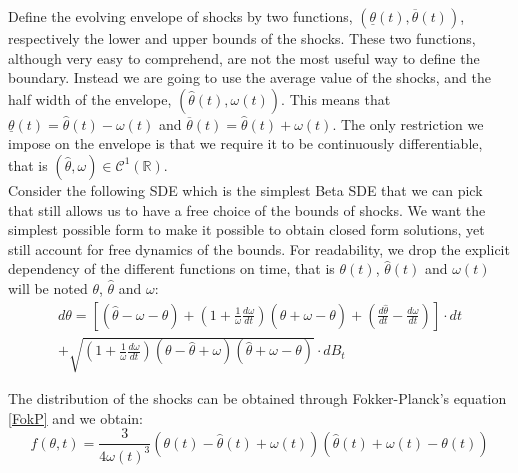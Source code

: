 Define the evolving envelope of shocks by two functions, $(\underline{\theta}(t),\overline{\theta}(t))$, respectively the lower and upper bounds of the shocks. These two functions, although very easy to comprehend, are not the most useful way to define the boundary. Instead we are going to use the average value of the shocks, and the half width of the envelope, $(\hat{\theta}(t), \omega(t))$. This means that $\underline{\theta}(t)=\hat{\theta}(t)-\omega(t)$ and $\overline{\theta}(t)=\hat{\theta}(t)+\omega(t)$. The only restriction we impose on the envelope is that we require it to be continuously differentiable, that is $(\hat{\theta},\omega)\in\mathcal{C}^1(\mathbb{R})$.\\

Consider the following SDE which is the simplest Beta SDE that we can pick that still allows us to have a free choice of the bounds of shocks. We want the simplest possible form to make it possible to obtain closed form solutions, yet still account for free dynamics of the bounds. For readability, we drop the explicit dependency of the different functions on time, that is $\theta(t)$, $\hat{\theta}(t)$ and $\omega(t)$ will be noted $\theta$, $\hat{\theta}$ and $\omega$:
\begin{equation}
\begin{split}
  d\theta=\left[(\hat{\theta}-\omega-\theta)+\left(1+\frac{1}{\omega}\frac{d\omega}{dt}\right)(\hat{\theta}+\omega-\theta)+\left(\frac{d\hat{\theta}}{dt}-\frac{d\omega}{dt}\right)\right]\cdot dt\\+\sqrt{\left(1+\frac{1}{\omega}\frac{d\omega}{dt}\right)(\theta-\hat{\theta}+\omega)(\hat{\theta}+\omega-\theta)}\cdot dB_{t}
\end{split}
\end{equation}

The distribution of the shocks can be obtained through Fokker-Planck's equation \ref{FokP} and we obtain:
\begin{equation}
f(\theta,t)=\frac{3}{4\omega(t)^3}(\theta(t)-\hat{\theta}(t)+\omega(t))(\hat{\theta}(t)+\omega(t)-\theta(t))
\label{distrib_prerescale}
\end{equation}

